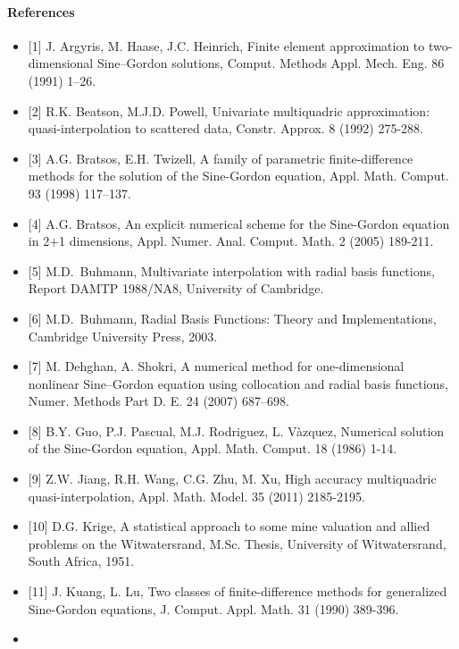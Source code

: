 \documentclass[12pt]{article}
\providecommand{\tightlist}{%
  \setlength{\itemsep}{0pt}\setlength{\parskip}{0pt}}
\begin{document}
\hypertarget{references}{%
\paragraph{References}\label{references}}

\begin{itemize}
\tightlist
\item
  {[}1{]} J. Argyris, M. Haase, J.C. Heinrich, Finite element
  approximation to two-dimensional Sine--Gordon solutions, Comput.
  Methods Appl. Mech. Eng. 86 (1991) 1--26.
\item
  {[}2{]} R.K. Beatson, M.J.D. Powell, Univariate multiquadric
  approximation: quasi-interpolation to scattered data, Constr. Approx.
  8 (1992) 275-288.
\item
  {[}3{]} A.G. Bratsos, E.H. Twizell, A family of parametric
  finite-difference methods for the solution of the Sine-Gordon
  equation, Appl. Math. Comput. 93 (1998) 117--137.
\item
  {[}4{]} A.G. Bratsos, An explicit numerical scheme for the Sine-Gordon  equation in 2+1 dimensions, Appl. Numer. Anal. Comput. Math. 2  (2005) 189-211.
\item
  {[}5{]} M.D.~Buhmann, Multivariate interpolation with radial basis  functions, Report DAMTP 1988/NA8, University of Cambridge.
\item
  {[}6{]} M.D.~Buhmann, Radial Basis Functions: Theory and
  Implementations, Cambridge University Press, 2003.
\item
  {[}7{]} M. Dehghan, A. Shokri, A numerical method for one-dimensional
  nonlinear Sine--Gordon equation using collocation and radial basis
  functions, Numer. Methods Part D. E. 24 (2007) 687--698.
\item
  {[}8{]} B.Y. Guo, P.J. Pascual, M.J. Rodriguez, L. Vàzquez, Numerical
  solution of the Sine-Gordon equation, Appl. Math. Comput. 18 (1986)
  1-14.
\item
  {[}9{]} Z.W. Jiang, R.H. Wang, C.G. Zhu, M. Xu, High accuracy
  multiquadric quasi-interpolation, Appl. Math. Model. 35 (2011)
  2185-2195.
\item
  {[}10{]} D.G. Krige, A statistical approach to some mine valuation and
  allied problems on the Witwatersrand, M.Sc. Thesis, University of
  Witwatersrand, South Africa, 1951.
\item
  {[}11{]} J. Kuang, L. Lu, Two classes of finite-difference methods for
  generalized Sine-Gordon equations, J. Comput. Appl. Math. 31 (1990)
  389-396.
\item

\end{itemize}
\end{document}
